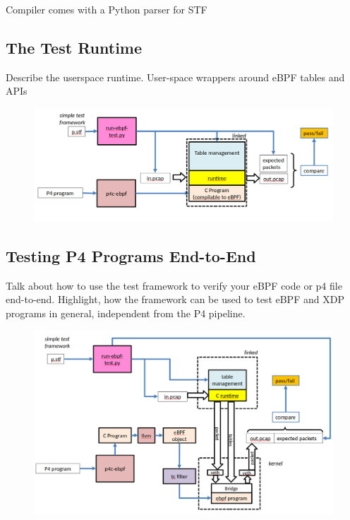 Compiler comes with a Python parser for STF

\subsection{The Test Runtime}
Describe the userspace runtime.
User-space wrappers around eBPF tables and APIs
\begin{figure}
	\centering
	\includegraphics[width=0.7\linewidth]{user_test}
	\caption{}
	\label{fig:user_test}
\end{figure}

\subsection{Testing P4 Programs End-to-End}
Talk about how to use the test framework to verify your eBPF code or p4 file 
end-to-end. Highlight, how the framework can be used to test eBPF and XDP 
programs in general, independent from the P4 pipeline.
\begin{figure}
	\centering
	\includegraphics[width=0.7\linewidth]{kernel_test}
	\caption{}
	\label{fig:kernel_test}
\end{figure}